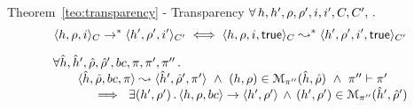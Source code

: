 \begin{temax}{Theorem~\ref{teo:transparency} - Transparency} 
$\forall \, h, h', \rho, \rho', i, i', C, C', \, . \,$
$$
  \semtranstrans{\heap, \store, i}{\heap', \store', i'}[\ctx][\ctx']
  \iff
  \symbtranstrans{\heap, \store, i, \jtrue}{\heap', \store', i', \jtrue}[\ctx][\ctx'] 
$$
\end{temax}

\begin{lemma}\label{soundness:basic:commands}
$$
\begin{array}{l}
\forall \sheap, \sheap', \sstore, \sstore', \bcmd, \pc, \pc', \pc'' \, . \,  \\
\qquad \symbtrans{\sheap, \sstore, \bcmd, \pc}{\sheap', \sstore', \pc'}
   \ \wedge \ 
      (\heap, \store) \in \smodels{\sheap, \sstore}{\pc''} 
            \ \wedge \ \pc'' \vdash \pc' \\ \qquad \quad
      	 \ \implies \ \exists (\heap', \store') \, . \, 
	 	 \semtrans{\heap, \store, \bcmd}{\heap', \store'}
		\, \wedge \, 
		(\heap', \store') \in \smodels{\sheap', \sstore'}{\pc''}  
\end{array}
$$
\end{lemma}
